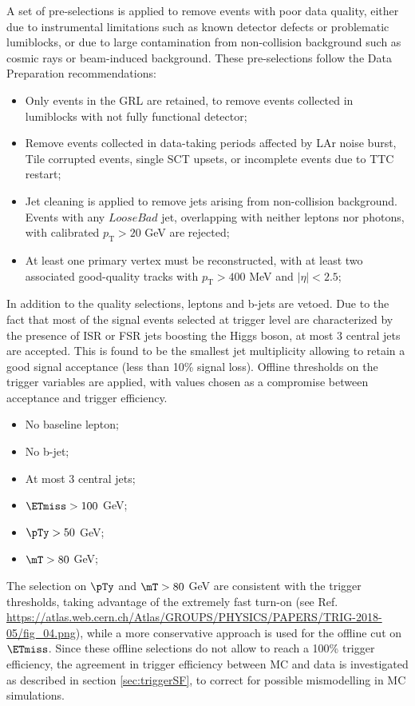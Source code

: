 A set of pre-selections is applied to remove events with poor data quality, either due to instrumental limitations such as known detector defects or problematic lumiblocks, or due to large contamination from non-collision background such as cosmic rays or beam-induced background. 
These pre-selections follow the Data Preparation recommendations: 
\begin{itemize}
	\item{Only events in the GRL are retained, to remove events collected in lumiblocks with not fully functional detector;}	
	\item{Remove events collected in data-taking periods affected by LAr noise burst, Tile corrupted events, single SCT upsets, or incomplete events due to TTC restart;}
	\item{Jet cleaning is applied to remove jets arising from non-collision background. Events with any $LooseBad$ jet, overlapping with neither leptons nor photons, with calibrated $p_{\mathrm{T}}>20$ GeV are rejected;}
    \item{At least one primary vertex must be reconstructed, with at least two associated good-quality tracks with $p_{\mathrm{T}}>400$ MeV and $|\eta|<2.5$;}
\end{itemize}


In addition to the quality selections, leptons and b-jets are vetoed. Due to the fact that most of the signal events selected at trigger level are characterized by the presence of ISR or FSR jets boosting the Higgs boson, at most 3 central jets are accepted. This is found to be the smallest jet multiplicity allowing to retain a good signal acceptance (less than 10\% signal loss).  Offline thresholds on the trigger variables are applied, with values chosen as a compromise between acceptance and trigger efficiency. 
\begin{itemize}
	\item{No baseline lepton;}
	\item{No b-jet;}
	\item{At most 3 central jets;}
	\item{$\ETmiss>100$ GeV;}
	\item{$\pTy>50$ GeV;}
	\item{$\mT>80$ GeV;}
\end{itemize}

The selection on $\pTy$ and $\mT>80$ GeV are consistent with the trigger thresholds, taking advantage of the extremely fast turn-on (see Ref.~\cite{TRIG-2018-05} \href{Fig.04}{https://atlas.web.cern.ch/Atlas/GROUPS/PHYSICS/PAPERS/TRIG-2018-05/fig\_04.png}), while a more conservative approach is used for the offline cut on $\ETmiss$. 
Since these offline selections do not allow to reach a 100\% trigger efficiency, the agreement in trigger efficiency between MC and data is investigated as described in section \ref{sec:triggerSF}, to correct for possible mismodelling in MC simulations. \\

